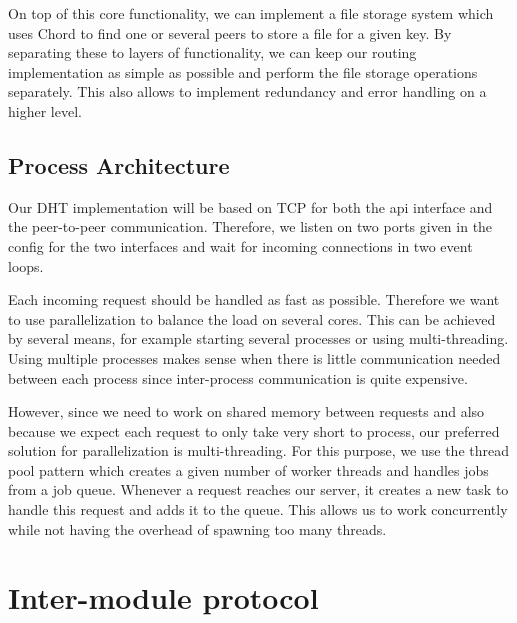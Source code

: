 \documentclass[a4paper, 11pt]{article}
\begin{document}
On top of this core functionality, we can implement a file storage system which uses Chord to find one or several peers to store a file for a given key. By separating these to layers of functionality, we can keep our routing implementation as simple as possible and perform the file storage operations separately. This also allows to implement redundancy and error handling on a higher level.

\subsection*{Process Architecture}

Our DHT implementation will be based on TCP for both the api interface and the peer-to-peer communication. Therefore, we listen on two ports given in the config for the two interfaces and wait for incoming connections in two event loops.

Each incoming request should be handled as fast as possible. Therefore we want to use parallelization to balance the load on several cores. This can be achieved by several means, for example starting several processes or using multi-threading.
Using multiple processes makes sense when there is little communication needed between each process since inter-process communication is quite expensive.

However, since we need to work on shared memory between requests and also because we expect each request to only take very short to process, our preferred solution for parallelization is multi-threading. For this purpose, we use the thread pool pattern which creates a given number of worker threads and handles jobs from a job queue. Whenever a request reaches our server, it creates a new task to handle this request and adds it to the queue. This allows us to work concurrently while not having the overhead of spawning too many threads.




\section*{Inter-module protocol}

\end{document}
